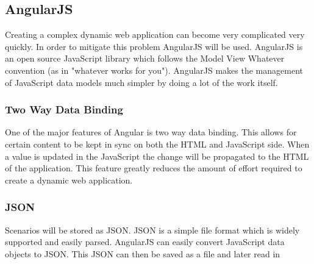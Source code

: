 \subsection{AngularJS}
Creating a complex dynamic web application can become very complicated very quickly. In order to mitigate this problem AngularJS will be used. AngularJS is an open source JavaScript library which follows the Model View Whatever convention (as in "whatever works for you"). AngularJS makes the management of JavaScript data models much simpler by doing a lot of the work itself.

\subsubsection{Two Way Data Binding}
One of the major features of Angular is two way data binding. This allows for certain content to be kept in sync on both the HTML and JavaScript side. When a value is updated in the JavaScript the change will be propagated to the HTML of the application. This feature greatly reduces the amount of effort required to create a dynamic web application.

\subsubsection{JSON}
Scenarios will be stored as JSON. JSON is a simple file format which is widely supported and easily parsed. AngularJS can easily convert JavaScript data objects to JSON. This JSON can then be saved as a file and later read in \ourgame{}

